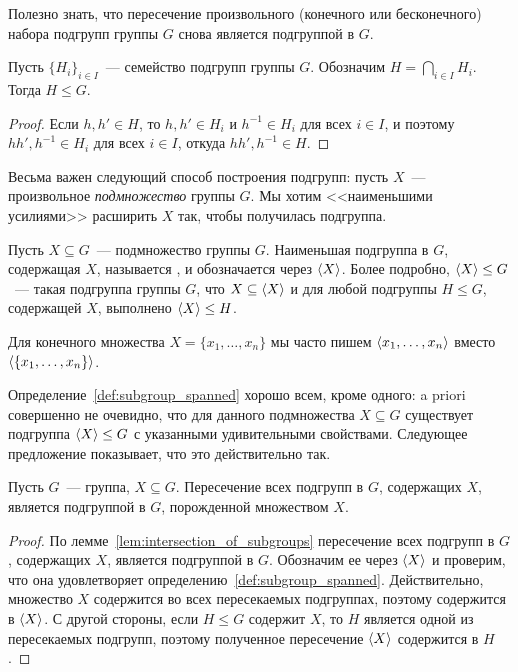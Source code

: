 Полезно знать, что пересечение произвольного (конечного или
бесконечного) набора подгрупп группы $G$ снова является подгруппой в
$G$.
\begin{lemma}\label{lem:intersection_of_subgroups}
Пусть $\{H_i\}_{i\in I}$~--- семейство подгрупп группы $G$.
Обозначим $H=\bigcap_{i\in I} H_i$. Тогда $H\leq G$.
\end{lemma}
\begin{proof}
Если $h,h'\in H$, то $h,h'\in H_i$ и $h^{-1}\in H_i$ для всех $i\in
I$, и поэтому $hh', h^{-1}\in H_i$ для всех $i\in I$, откуда $hh',
h^{-1}\in H$.
\end{proof}

Весьма важен следующий способ построения подгрупп: пусть $X$~---
произвольное {\it подмножество} группы $G$. Мы хотим
<<наименьшими усилиями>> расширить $X$ так, чтобы получилась
подгруппа.

\begin{definition}\label{def:subgroup_spanned}
Пусть $X\subseteq G$~--- подмножество группы $G$. Наименьшая
подгруппа в $G$, содержащая $X$, называется , и обозначается через $\langle X\rangle$. Более подробно,
$\langle X\rangle\leq G$~--- такая подгруппа группы $G$, что
$X\subseteq \langle X\rangle$ и для любой подгруппы $H\leq G$, содержащей $X$,
выполнено $\langle X\rangle\leq H$.
\end{definition}

\begin{remark}
Для конечного множества $X=\{x_1,\dots,x_n\}$ мы часто пишем
$\langle x_1,\dots,x_n\rangle$ вместо $\langle \{x_1,\dots,x_n\}\rangle$.
\end{remark}

Определение~\ref{def:subgroup_spanned} хорошо всем, кроме одного: a
priori совершенно не
очевидно, что для данного подмножества $X\subseteq G$ существует
подгруппа $\langle X\rangle\leq G$ с указанными удивительными свойствами.
Следующее предложение показывает, что это действительно так.
\begin{proposition}\label{prop:subgroup_spanned_as_intersection}
Пусть $G$~--- группа, $X\subseteq G$. Пересечение всех подгрупп в $G$,
содержащих $X$, является подгруппой в $G$, порожденной множеством $X$.
\end{proposition}
\begin{proof}
По лемме~\ref{lem:intersection_of_subgroups} пересечение всех подгрупп
в $G$, содержащих $X$, является подгруппой в $G$. Обозначим ее через
$\langle X\rangle$ и проверим, что она удовлетворяет
определению~\ref{def:subgroup_spanned}. Действительно, множество $X$
содержится во всех пересекаемых подгруппах, поэтому содержится в
$\langle X\rangle$. С другой стороны, если $H\leq G$ содержит $X$, то $H$
является одной из пересекаемых подгрупп, поэтому полученное
пересечение $\langle X\rangle$ содержится в $H$.
\end{proof}

